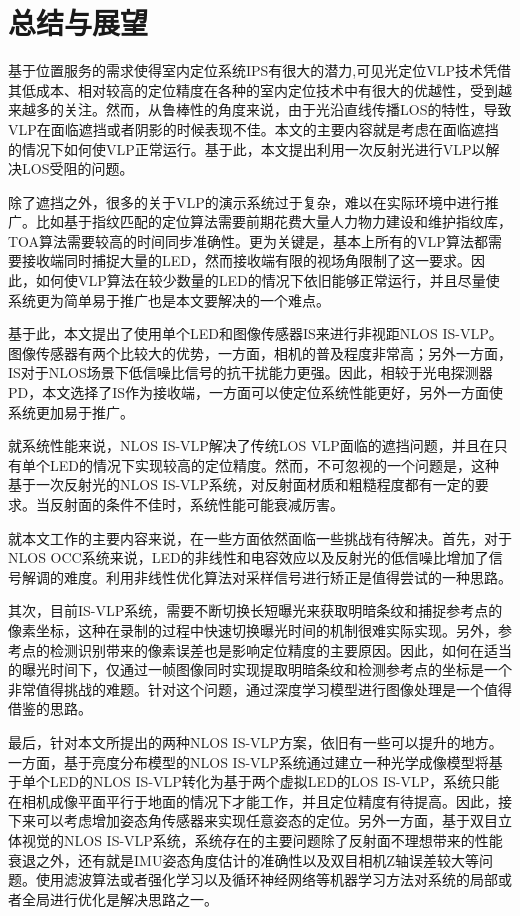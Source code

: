 \chapter{总结与展望}
基于位置服务的需求使得室内定位系统IPS有很大的潜力,可见光定位VLP技术凭借其低成本、相对较高的定位精度在各种的室内定位技术中有很大的优越性，受到越来越多的关注。然而，从鲁棒性的角度来说，由于光沿直线传播LOS的特性，导致VLP在面临遮挡或者阴影的时候表现不佳。本文的主要内容就是考虑在面临遮挡的情况下如何使VLP正常运行。基于此，本文提出利用一次反射光进行VLP以解决LOS受阻的问题。

除了遮挡之外，很多的关于VLP的演示系统过于复杂，难以在实际环境中进行推广。比如基于指纹匹配的定位算法需要前期花费大量人力物力建设和维护指纹库，TOA算法需要较高的时间同步准确性。更为关键是，基本上所有的VLP算法都需要接收端同时捕捉大量的LED，然而接收端有限的视场角限制了这一要求。因此，如何使VLP算法在较少数量的LED的情况下依旧能够正常运行，并且尽量使系统更为简单易于推广也是本文要解决的一个难点。

基于此，本文提出了使用单个LED和图像传感器IS来进行非视距NLOS IS-VLP。图像传感器有两个比较大的优势，一方面，相机的普及程度非常高；另外一方面，IS对于NLOS场景下低信噪比信号的抗干扰能力更强。因此，相较于光电探测器PD，本文选择了IS作为接收端，一方面可以使定位系统性能更好，另外一方面使系统更加易于推广。

就系统性能来说，NLOS IS-VLP解决了传统LOS VLP面临的遮挡问题，并且在只有单个LED的情况下实现较高的定位精度。然而，不可忽视的一个问题是，这种基于一次反射光的NLOS IS-VLP系统，对反射面材质和粗糙程度都有一定的要求。当反射面的条件不佳时，系统性能可能衰减厉害。

就本文工作的主要内容来说，在一些方面依然面临一些挑战有待解决。首先，对于NLOS OCC系统来说，LED的非线性和电容效应以及反射光的低信噪比增加了信号解调的难度。利用非线性优化算法对采样信号进行矫正是值得尝试的一种思路。

其次，目前IS-VLP系统，需要不断切换长短曝光来获取明暗条纹和捕捉参考点的像素坐标，这种在录制的过程中快速切换曝光时间的机制很难实际实现。另外，参考点的检测识别带来的像素误差也是影响定位精度的主要原因。因此，如何在适当的曝光时间下，仅通过一帧图像同时实现提取明暗条纹和检测参考点的坐标是一个非常值得挑战的难题。针对这个问题，通过深度学习模型进行图像处理是一个值得借鉴的思路。

最后，针对本文所提出的两种NLOS IS-VLP方案，依旧有一些可以提升的地方。一方面，基于亮度分布模型的NLOS IS-VLP系统通过建立一种光学成像模型将基于单个LED的NLOS IS-VLP转化为基于两个虚拟LED的LOS IS-VLP，系统只能在相机成像平面平行于地面的情况下才能工作，并且定位精度有待提高。因此，接下来可以考虑增加姿态角传感器来实现任意姿态的定位。另外一方面，基于双目立体视觉的NLOS IS-VLP系统，系统存在的主要问题除了反射面不理想带来的性能衰退之外，还有就是IMU姿态角度估计的准确性以及双目相机Z轴误差较大等问题。使用滤波算法或者强化学习以及循环神经网络等机器学习方法对系统的局部或者全局进行优化是解决思路之一。

